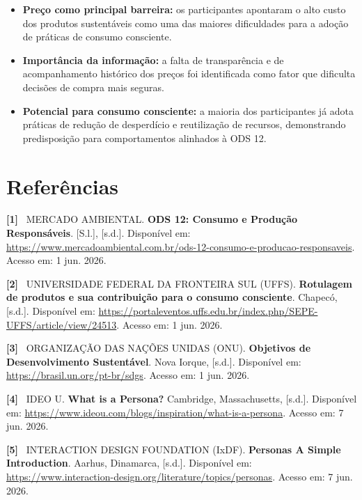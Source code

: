 \documentclass[12pt, a4paper]{article}
\newcommand{\novaSecao}[1]{\clearpage\vspace*{2.2cm}\section{#1}}
\begin{document}
\vspace{4pt}

\begin{itemize}[leftmargin=1.2em, itemsep=4pt, label=\textcolor{wineSoft}{\textbf{\textbullet}}]
  \item \textbf{Preço como principal barreira:} os participantes apontaram o alto custo dos produtos sustentáveis como uma das maiores dificuldades para a adoção de práticas de consumo consciente.
  \item \textbf{Importância da informação:} a falta de transparência e de acompanhamento histórico dos preços foi identificada como fator que dificulta decisões de compra mais seguras.
  \item \textbf{Potencial para consumo consciente:} a maioria dos participantes já adota práticas de redução de desperdício e reutilização de recursos, demonstrando predisposição para comportamentos alinhados à ODS 12.
\end{itemize}

\novaSecao{Referências}

\setlength{\parskip}{10pt}

\newcommand{\refnum}[1]{\textcolor{wineDeep}{\sffamily\bfseries[#1]}\ }

\refnum{1} MERCADO AMBIENTAL. \textbf{ODS 12: Consumo e Produção Responsáveis}. [S.l.], [s.d.]. Disponível em: \url{https://www.mercadoambiental.com.br/ods-12-consumo-e-producao-responsaveis}. Acesso em: 1 jun. 2026.

\refnum{2} UNIVERSIDADE FEDERAL DA FRONTEIRA SUL (UFFS). \textbf{Rotulagem de produtos e sua contribuição para o consumo consciente}. Chapecó, [s.d.]. Disponível em: \url{https://portaleventos.uffs.edu.br/index.php/SEPE-UFFS/article/view/24513}. Acesso em: 1 jun. 2026.

\refnum{3} ORGANIZAÇÃO DAS NAÇÕES UNIDAS (ONU). \textbf{Objetivos de Desenvolvimento Sustentável}. Nova Iorque, [s.d.]. Disponível em: \url{https://brasil.un.org/pt-br/sdgs}. Acesso em: 1 jun. 2026.

\refnum{4} IDEO U. \textbf{What is a Persona?} Cambridge, Massachusetts, [s.d.]. Disponível em: \url{https://www.ideou.com/blogs/inspiration/what-is-a-persona}. Acesso em: 7 jun. 2026.

\refnum{5} INTERACTION DESIGN FOUNDATION (IxDF). \textbf{Personas \textemdash{} A Simple Introduction}. Aarhus, Dinamarca, [s.d.]. Disponível em: \url{https://www.interaction-design.org/literature/topics/personas}. Acesso em: 7 jun. 2026.
\end{document}
